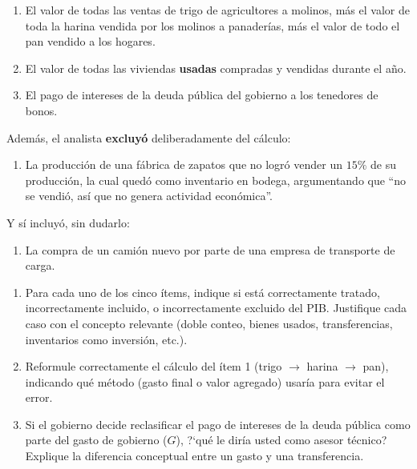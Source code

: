\documentclass[11pt]{article}
\newenvironment{partes}
  {\begin{enumerate}[label=(\alph*), leftmargin=1.5cm]}
  {\end{enumerate}}
\begin{document}
\begin{enumerate}[label=\arabic*.]
    \item El valor de todas las ventas de trigo de agricultores a molinos, m\'as el valor de toda la harina vendida por los molinos a panader\'ias, m\'as el valor de todo el pan vendido a los hogares.
    \item El valor de todas las viviendas \textbf{usadas} compradas y vendidas durante el a\~no.
    \item El pago de intereses de la deuda p\'ublica del gobierno a los tenedores de bonos.
\end{enumerate}
Adem\'as, el analista \textbf{excluy\'o} deliberadamente del c\'alculo:
\begin{enumerate}[label=\arabic*., resume]
    \item La producci\'on de una f\'abrica de zapatos que no logr\'o vender un $15\%$ de su producci\'on, la cual qued\'o como inventario en bodega, argumentando que ``no se vendi\'o, as\'i que no genera actividad econ\'omica''.
\end{enumerate}
Y s\'i incluy\'o, sin dudarlo:
\begin{enumerate}[label=\arabic*., resume]
    \item La compra de un cami\'on nuevo por parte de una empresa de transporte de carga.
\end{enumerate}

\begin{partes}
    \item Para cada uno de los cinco \'items, indique si est\'a correctamente tratado, incorrectamente incluido, o incorrectamente excluido del PIB. Justifique cada caso con el concepto relevante (doble conteo, bienes usados, transferencias, inventarios como inversi\'on, etc.).
    \item Reformule correctamente el c\'alculo del \'item 1 (trigo $\to$ harina $\to$ pan), indicando qu\'e m\'etodo (gasto final o valor agregado) usar\'ia para evitar el error.
    \item Si el gobierno decide reclasificar el pago de intereses de la deuda p\'ublica como parte del gasto de gobierno ($G$), ?`qu\'e le dir\'ia usted como asesor t\'ecnico? Explique la diferencia conceptual entre un gasto y una transferencia.
\end{partes}
\end{document}
